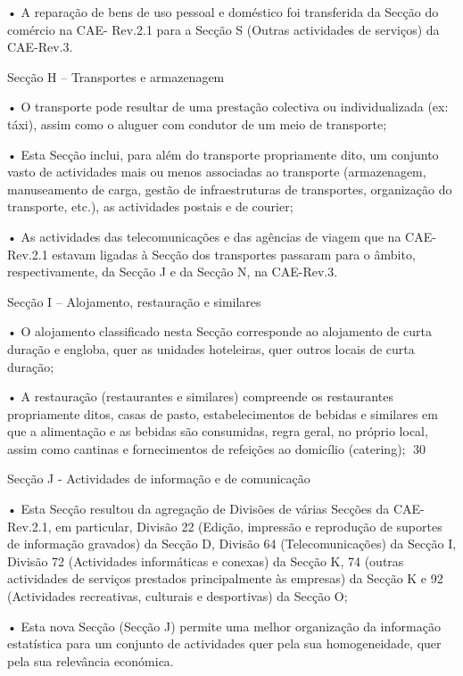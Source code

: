        • A reparação de bens de uso pessoal e doméstico foi transferida da Secção do comércio na CAE-
         Rev.2.1 para a Secção S (Outras actividades de serviços) da CAE-Rev.3.

Secção H – Transportes e armazenagem

       • O transporte pode resultar de uma prestação colectiva ou individualizada (ex: táxi), assim como o
         aluguer com condutor de um meio de transporte;

       • Esta Secção inclui, para além do transporte propriamente dito, um conjunto vasto de actividades
         mais ou menos associadas ao transporte (armazenagem, manuseamento de carga, gestão de
         infraestruturas de transportes, organização do transporte, etc.), as actividades postais e de courier;

       • As actividades das telecomunicações e das agências de viagem que na CAE-Rev.2.1 estavam
         ligadas à Secção dos transportes passaram para o âmbito, respectivamente, da Secção J e da
         Secção N, na CAE-Rev.3.

Secção I – Alojamento, restauração e similares

       • O alojamento classificado nesta Secção corresponde ao alojamento de curta duração e engloba,
         quer as unidades hoteleiras, quer outros locais de curta duração;

       • A restauração (restaurantes e similares) compreende os restaurantes propriamente ditos, casas
         de pasto, estabelecimentos de bebidas e similares em que a alimentação e as bebidas são
         consumidas, regra geral, no próprio local, assim como cantinas e fornecimentos de refeições ao
         domicílio (catering);
30



     Secção J - Actividades de informação e de comunicação

             • Esta Secção resultou da agregação de Divisões de várias Secções da CAE-Rev.2.1, em particular,
               Divisão 22 (Edição, impressão e reprodução de suportes de informação gravados) da Secção D,
               Divisão 64 (Telecomunicações) da Secção I, Divisão 72 (Actividades informáticas e conexas) da
               Secção K, 74 (outras actividades de serviços prestados principalmente às empresas) da Secção
               K e 92 (Actividades recreativas, culturais e desportivas) da Secção O;

             • Esta nova Secção (Secção J) permite uma melhor organização da informação estatística para um
               conjunto de actividades quer pela sua homogeneidade, quer pela sua relevância económica.

